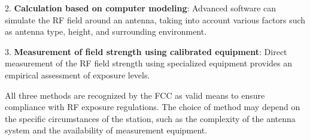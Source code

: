 2. \textbf{Calculation based on computer modeling}: Advanced software can simulate the RF field around an antenna, taking into account various factors such as antenna type, height, and surrounding environment.

3. \textbf{Measurement of field strength using calibrated equipment}: Direct measurement of the RF field strength using specialized equipment provides an empirical assessment of exposure levels.

All three methods are recognized by the FCC as valid means to ensure compliance with RF exposure regulations. The choice of method may depend on the specific circumstances of the station, such as the complexity of the antenna system and the availability of measurement equipment.

